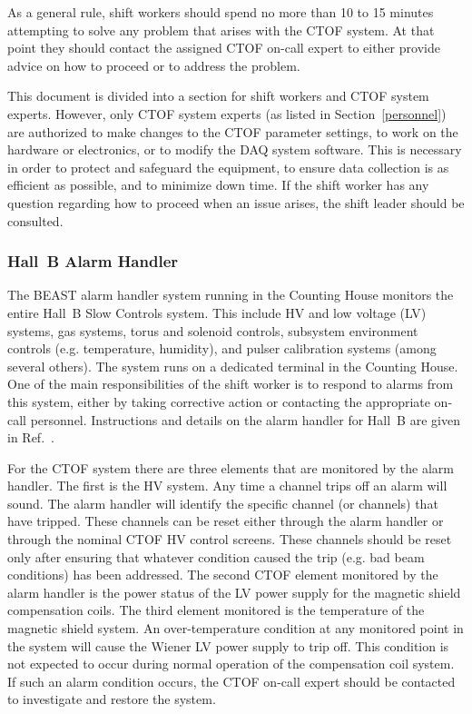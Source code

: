 \documentclass[12pt]{article}
\begin{document}
As a general rule, shift workers should spend no more than 10 to 15 minutes attempting to solve
any problem that arises with the CTOF system. At that point they should contact the assigned 
CTOF on-call expert to either provide advice on how to proceed or to address the problem.

This document is divided into a section for shift workers and CTOF system experts. However, only 
CTOF system experts (as listed in Section~\ref{personnel}) are authorized to make changes to the 
CTOF parameter settings, to work on the hardware or electronics, or to modify the DAQ system 
software. This is necessary in order to protect and safeguard the equipment, to ensure data 
collection is as efficient as possible, and to minimize down time. If the shift worker has any 
question regarding how to proceed when an issue arises, the shift leader should be consulted.

\subsubsection{Hall~B Alarm Handler}
\label{alarms}

The BEAST alarm handler system running in the Counting House monitors the entire Hall~B Slow 
Controls system. This include HV and low voltage (LV) systems, gas systems, torus and solenoid 
controls, subsystem environment controls (e.g. temperature, humidity), and pulser calibration 
systems (among several others). The system runs on a dedicated terminal in the Counting House. 
One of the main responsibilities of the shift worker is to respond to alarms from this system, 
either by taking corrective action or contacting the appropriate on-call personnel. Instructions 
and details on the alarm handler for Hall~B are given in Ref.~\cite{beast}.

For the CTOF system there are three elements that are monitored by the alarm handler. The first 
is the HV system. Any time a channel trips off an alarm will sound. The alarm handler will identify 
the specific channel (or channels) that have tripped. These channels can be reset either through 
the alarm handler or through the nominal CTOF HV control screens. These channels should be reset 
only after ensuring that whatever condition caused the trip (e.g. bad beam conditions) has been 
addressed. The second CTOF element monitored by the alarm handler is the power status of the LV
power supply for the magnetic shield compensation coils. The third element monitored is the 
temperature of the magnetic shield system. An over-temperature condition at any monitored point 
in the system will cause the Wiener LV power supply to trip off. This condition is not expected 
to occur during normal operation of the compensation coil system. If such an alarm condition 
occurs, the CTOF on-call expert should be contacted to investigate and restore the system.
\end{document}
